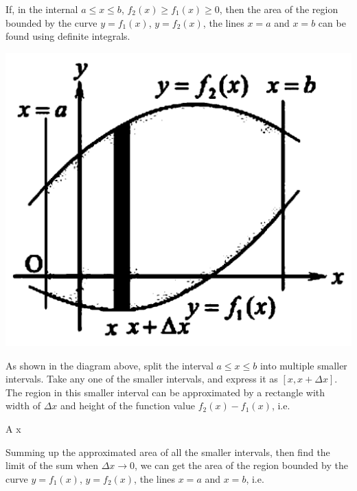     

    \newpage
    If, in the internal $a \leq x \leq b$, $f_2(x) \geq f_1(x) \geq 0$, then the
    area of the region bounded by the curve $y = f_1(x)$, $y = f_2(x)$, the lines
$x = a$ and $x = b$ can be found using definite integrals.
    \begin{center}
        \includegraphics[scale=0.15]{assets/28-16.png}
    \end{center}

    As shown in the diagram above, split the interval $a \leq x \leq b$ into
    multiple smaller intervals. Take any one of the smaller intervals, and express
    it as $[x, x + \Delta x]$. The region in this smaller interval can be
    approximated by a rectangle with width of $\Delta x$ and height of the function
    value $f_2(x) - f_1(x)$, i.e.
    \begin{cequation}
        \Delta A \approx [f_2(x) - f_1(x)]\Delta x
    \end{cequation}

    Summing up the approximated area of all the smaller intervals, then find the
    limit of the sum when $\Delta x \to 0$, we can get the area of the region
    bounded by the curve $y = f_1(x)$, $y = f_2(x)$, the lines $x = a$ and $x = b$,
    i.e.
    \begin{center}
    \end{center}

